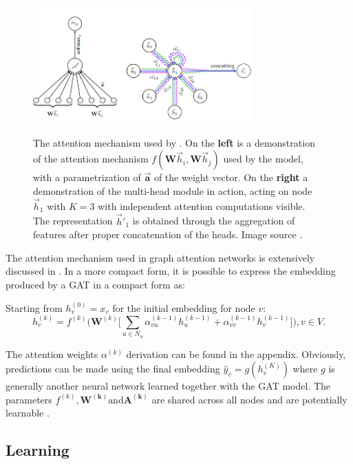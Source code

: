 \begin{figure}[H]
  \centering
  \includegraphics[width=0.75\textwidth]{Figures/chap_gnn/multiheadgat.png}
  \label{fig:multiheadGAN}
  \caption[Multi-head attention mechanism for representation
extraction]{The attention mechanism used by
\citet{velickovic2017graph}. On the \textbf{left} is a demonstration
of the attention mechanism $f(\bm{W}\vec{h}_i, \bm{W}\vec{h}_j) $ used
by the model, with a parametrization of $\bm{\vec{a}}$ of the weight
vector. On the \textbf{right} a demonstration of the multi-head module
in action, acting on node $\vec{h}_1$ with $K=3$ with independent
attention computations visible. The representation $\vec{h}'_1$ is
obtained through the aggregation of features after proper
concatenation of the heads. Image source \cite{velickovic2017graph}.}
\end{figure}

The attention mechanism used in graph attention networks is extensively
discussed in . In a more compact form, it is possible
to express the embedding produced by a GAT in a compact form as:

Starting from $h_v^{(0)} = x_v$ for the initial embedding for node $v$:
\begin{equation}
h_v^{(k)} = f^{(k)} \Big( \bm{W}^{(k)}\Big[ \sum_{u\in
N_u}\alpha^{(k-1)}_{vu}h^{(k-1)}_u +
\alpha_{vv}^{(k-1)}h_v^{(k-1)}\Big] \Big), v \in V.
\label{eq:gat_compact}
\end{equation}

The attention weights $\alpha^{(k)}$ derivation can be found in the
appendix. Obviously, predictions can be made using the final embedding
$\hat{y}_v = g(h_v^{(K)})$ where $g$ is generally another neural network
learned together with the GAT model. The parameters $f^{(k)}, \bm{W^{(k)}} \text{and}
\bm{A^{(k)}}$ are shared across all nodes and are potentially learnable \cite{daigavane2021understanding}.

\subsection{Learning}

